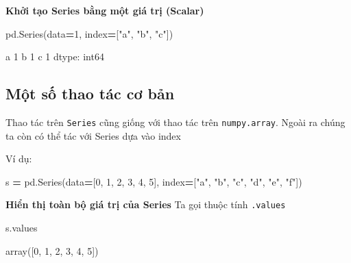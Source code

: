 \documentclass[
]{book}
\newenvironment{Shaded}{\begin{snugshade}}{\end{snugshade}}
\newcommand{\DecValTok}[1]{\textcolor[rgb]{0.00,0.00,0.81}{#1}}
\newcommand{\NormalTok}[1]{#1}
\newcommand{\OperatorTok}[1]{\textcolor[rgb]{0.81,0.36,0.00}{\textbf{#1}}}
\newcommand{\StringTok}[1]{\textcolor[rgb]{0.31,0.60,0.02}{#1}}
\begin{document}
\textbf{Khởi tạo Series bằng một giá trị (Scalar)}

\begin{Shaded}
\begin{Highlighting}[]
\NormalTok{pd.Series(data}\OperatorTok{=}\DecValTok{1}\NormalTok{, index}\OperatorTok{=}\NormalTok{[}\StringTok{"a"}\NormalTok{, }\StringTok{"b"}\NormalTok{, }\StringTok{"c"}\NormalTok{])}
\end{Highlighting}
\end{Shaded}

\begin{Shaded}
\begin{Highlighting}[]
\NormalTok{a    }\DecValTok{1}
\NormalTok{b    }\DecValTok{1}
\NormalTok{c    }\DecValTok{1}
\NormalTok{dtype: int64}
\end{Highlighting}
\end{Shaded}

\subsection{Một số thao tác cơ bản}\label{mux1ed9t-sux1ed1-thao-tuxe1c-cux1a1-bux1ea3n}

Thao tác trên \texttt{Series} cũng giống với thao tác trên \texttt{numpy.array}. Ngoài ra chúng ta còn có thể
tác với Series dựa vào index

Ví dụ:

\begin{Shaded}
\begin{Highlighting}[]
\NormalTok{s }\OperatorTok{=}\NormalTok{ pd.Series(data}\OperatorTok{=}\NormalTok{[}\DecValTok{0}\NormalTok{, }\DecValTok{1}\NormalTok{, }\DecValTok{2}\NormalTok{, }\DecValTok{3}\NormalTok{, }\DecValTok{4}\NormalTok{, }\DecValTok{5}\NormalTok{], index}\OperatorTok{=}\NormalTok{[}\StringTok{"a"}\NormalTok{, }\StringTok{"b"}\NormalTok{, }\StringTok{"c"}\NormalTok{, }\StringTok{"d"}\NormalTok{, }\StringTok{"e"}\NormalTok{, }\StringTok{"f"}\NormalTok{])}
\end{Highlighting}
\end{Shaded}

\textbf{Hiển thị toàn bộ giá trị của Series}
Ta gọi thuộc tính \texttt{.values}

\begin{Shaded}
\begin{Highlighting}[]
\NormalTok{s.values}
\end{Highlighting}
\end{Shaded}

\begin{Shaded}
\begin{Highlighting}[]
\NormalTok{array([}\DecValTok{0}\NormalTok{, }\DecValTok{1}\NormalTok{, }\DecValTok{2}\NormalTok{, }\DecValTok{3}\NormalTok{, }\DecValTok{4}\NormalTok{, }\DecValTok{5}\NormalTok{])}
\end{Highlighting}
\end{Shaded}
\end{document}
